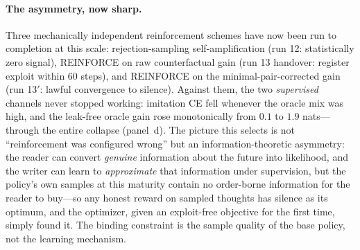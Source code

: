 \documentclass{article} %
\begin{document}
\paragraph{The asymmetry, now sharp.} Three mechanically independent reinforcement schemes have now been run to completion at this scale: rejection-sampling self-amplification (run 12: statistically zero signal), REINFORCE on raw counterfactual gain (run 13 handover: register exploit within 60 steps), and REINFORCE on the minimal-pair-corrected gain (run 13$'$: lawful convergence to silence). Against them, the two \emph{supervised} channels never stopped working: imitation CE fell whenever the oracle mix was high, and the leak-free oracle gain rose monotonically from $0.1$ to $1.9$ nats---through the entire collapse (panel~d). The picture this selects is not ``reinforcement was configured wrong'' but an information-theoretic asymmetry: the reader can convert \emph{genuine} information about the future into likelihood, and the writer can learn to \emph{approximate} that information under supervision, but the policy's own samples at this maturity contain no order-borne information for the reader to buy---so any honest reward on sampled thoughts has silence as its optimum, and the optimizer, given an exploit-free objective for the first time, simply found it. The binding constraint is the sample quality of the base policy, not the learning mechanism.
\end{document}
